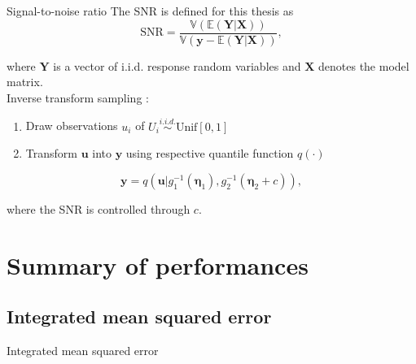 \documentclass[xcolor=dvipsnames]{beamer}
\begin{document}
\begin{frame}{Signal-to-noise ratio}
  The \ac{SNR} is defined for this thesis as
  \begin{equation}
    \text{SNR} = \frac{\mathbb{V}( \mathbb{E}( \bm{Y} | \bm{X} ) )}{ \mathbb{V}( \bm{y} - \mathbb{E}( \bm{Y} | \bm{X} ) )},
  \end{equation}

  where $\bm{Y}$ is a vector of i.i.d. response random variables and $\bm{X}$ denotes the model matrix. \\
  Inverse transform sampling \parencite[see e. g.][]{random-number-generation}:
  \begin{enumerate}
    \item Draw observations $u_i$ of $U_i \overset{i.i.d.}{\sim} \text{Unif}[0, 1]$
    \item Transform $\bm{u}$ into $\bm{y}$ using respective quantile function $q(\cdot)$
  \end{enumerate}
  \begin{equation}
  \bm{y} = q(\bm{u} | g_1^{-1}(\bm{\eta}_1), g_2^{-1}(\bm{\eta}_2 + c)),
  \end{equation}

  where the \ac{SNR} is controlled through $c$.
\end{frame}

\section{Summary of performances}
\subsection{Integrated mean squared error}
\begin{frame}{Integrated mean squared error}
\end{frame}
\end{document}
